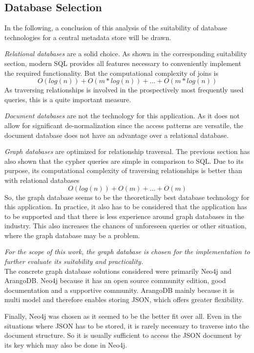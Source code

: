 \subsection{Database Selection}
In the following, a conclusion of this analysis of the suitability of database technologies for a central metadata store will be drawn.\par 
\emph{Relational databases} are a solid choice. As shown in the corresponding suitability section, modern SQL provides all features necessary to conveniently implement the required functionality. But the computational complexity of joins is 
$$O(log(n)) + O(m*log(n)) + ... + O(m*log(n))$$
As traversing relationships is involved in the prospectively most frequently used queries, this is a quite important measure.\par 
\emph{Document databases} are not the technology for this application. As it does not allow for significant de-normalization since the access patterns are versatile, the document database does not have an advantage over a relational database.\par 
\emph{Graph databases} are optimized for relationship traversal. The previous section has also shown that the cypher queries are simple in comparison to SQL. Due to its purpose, its computational complexity of traversing relationships is better than with relational databases
$$O(log(n)) + O(m) + ... + O(m)$$
So, the graph database seems to be the theoretically best database technology for this application. In practice, it also has to be considered that the application has to be supported and that there is less experience around graph databases in the industry. This also increases the chances of unforeseen queries or other situation, where the graph database may be a problem.\par 
\emph{For the scope of this work, the graph database is chosen for the implementation to further evaluate its suitability and practicality.}\\

The concrete graph database solutions considered were primarily Neo4j and ArangoDB. Neo4j because it has an open source community edition, good documentation and a supportive community. ArangoDB mainly because it is multi model and therefore enables storing JSON, which offers greater flexibility.\par 
Finally, Neo4j was chosen as it seemed to be the better fit over all. Even in the situations where JSON has to be stored, it is rarely necessary to traverse into the document structure. So it is usually sufficient to access the JSON document by its key which may also be done in Neo4j.

